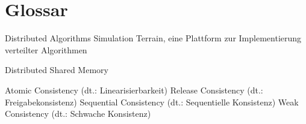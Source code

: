 \chapter{Glossar}

		{Distributed Algorithms Simulation Terrain, eine Plattform zur Implementierung verteilter Algorithmen \cite{Gottwald:03}}

			{Distributed Shared Memory}

			{Atomic Consistency (dt.: Linearisierbarkeit)}
			{Release Consistency (dt.: Freigabekonsistenz)}
			{Sequential Consistency (dt.: Sequentielle Konsistenz)}
			{Weak Consistency (dt.: Schwache Konsistenz)}
